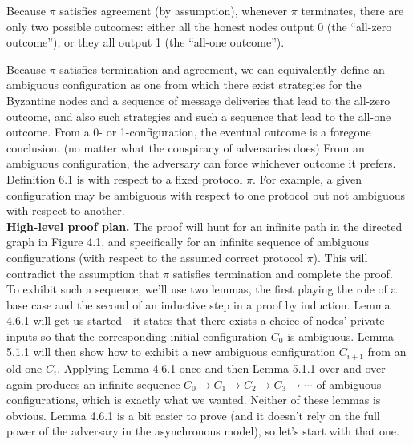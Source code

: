 Because $\pi$ satisfies agreement (by assumption), whenever $\pi$ terminates, there are only two
possible outcomes: either all the honest nodes output 0 (the “all-zero outcome”), or they all
output 1 (the “all-one outcome”).

Because $\pi$ satisfies termination and agreement, we can equivalently define an ambiguous
configuration as one from which there exist strategies for the Byzantine nodes and a sequence
of message deliveries that lead to the all-zero outcome, and also such strategies and such
a sequence that lead to the all-one outcome. From a 0- or 1-configuration, the eventual
outcome is a foregone conclusion. (no matter what the conspiracy of adversaries does) From an
ambiguous configuration, the adversary can force whichever outcome it prefers. Definition 6.1
is with respect to a fixed protocol $\pi$. For example, a given configuration may be ambiguous
with respect to one protocol but not ambiguous with respect to another.\\

\noindent
\textbf{High-level proof plan.} The proof will hunt for an infinite path in the directed graph in
Figure 4.1, and specifically for an infinite sequence of ambiguous configurations (with respect
to the assumed correct protocol $\pi$). This will contradict the assumption that $\pi$ satisfies
termination and complete the proof.\\
To exhibit such a sequence, we’ll use two lemmas, the first playing the role of a base
case and the second of an inductive step in a proof by induction. Lemma 4.6.1 will get us
started—it states that there exists a choice of nodes’ private inputs so that the corresponding
initial configuration $C_0$ is ambiguous. Lemma 5.1.1 will then show how to exhibit a new
ambiguous configuration $C_{i+1}$ from an old one $C_i$. Applying Lemma 4.6.1 once and then
Lemma 5.1.1 over and over again produces an infinite sequence $C_0 \to C_1 \to C_2 \to C_3 \to \cdots$
of ambiguous configurations, which is exactly what we wanted. Neither of these lemmas is
obvious. Lemma 4.6.1 is a bit easier to prove (and it doesn't rely on the full power of the
adversary in the asynchronous model), so let’s start with that one.

